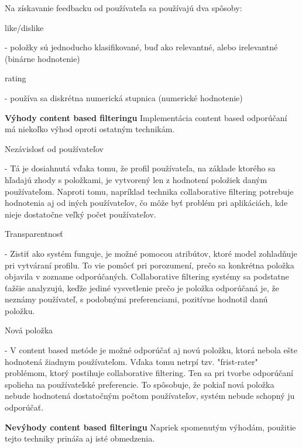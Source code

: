 Na získavanie feedbacku od používateľa sa používajú dva spôsoby: 
\begin{itemize}[leftmargin=*]
	{\bf \item like/dislike} - položky sú jednoducho klasifikované, buď ako relevantné, alebo irelevantné (binárne hodnotenie)  
	{\bf \item rating} - používa sa diskrétna numerická stupnica (numerické hodnotenie) \\
\end{itemize}

{\bf \large Výhody content based filteringu} \newline
	Implementácia content based odporúčaní má niekoľko výhod oproti ostatným technikám. 

\begin{itemize}[leftmargin=*]
	{\bf \item Nezávislosť od používateľov} - Tá je dosiahnutá vďaka tomu, že profil používateľa, na základe ktorého sa hľadajú zhody s položkami, je vytvorený len z hodnotení položiek daným používateľom. Naproti tomu, napríklad technika collaborative filtering potrebuje hodnotenia aj od iných používateľov, čo môže byť problém pri aplikáciách, kde nieje dostatočne veľký počet používateľov.
	{\bf \item Transparentnosť} - Zistiť ako systém funguje, je možné pomocou atribútov, ktoré model zohladňuje pri vytváraní profilu. To vie pomôcť pri porozumení, prečo sa konkrétna položka objavila v zozname odporúčaných. Collaborative filtering systémy sa podstatne ťažšie analyzujú, keďže jediné vysvetlenie prečo je položka odporúčaná je, že neznámy používateľ, s podobnými preferenciami, pozitívne hodnotil danú položku.
	{\bf \item Nová položka} - V content based metóde je možné odporúčať aj novú položku, ktorá nebola ešte hodnotená žiadnym používateľom. Vďaka tomu netrpí tzv. "frist-rater" problémom, ktorý postihuje collaborative filtering. Ten sa pri tvorbe odporúčaní spolieha na používateľské preferencie. To spôsobuje, že pokiaľ nová položka nebude hodnotená dostatočným počtom používateľov, systém nebude schopný ju odporúčať. \\
\end{itemize}


{\bf \large Nevýhody content based filteringu} \newline
	Napriek spomenutým výhodám, použitie tejto techniky prináša aj isté obmedzenia. 

